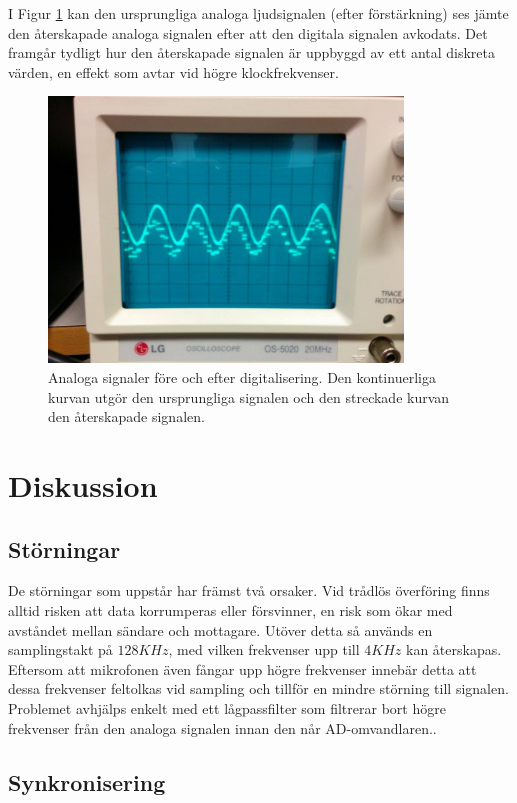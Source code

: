 \documentclass[a4paper,10pt]{article}
\begin{document}
I Figur \ref{oscilloskop} kan den ursprungliga analoga ljudsignalen (efter förstärkning) ses jämte den återskapade analoga signalen efter att den digitala
signalen avkodats. Det framgår tydligt hur den återskapade signalen är uppbyggd av ett antal diskreta värden, en effekt som avtar vid högre klockfrekvenser.

\begin{figure}[h]
\centering
\includegraphics[width=0.84\textwidth]{oscilloskop.jpg}
\caption{Analoga signaler före och efter digitalisering. Den kontinuerliga 
         kurvan utgör den ursprungliga signalen och den streckade kurvan den 
	 återskapade signalen.}
\label{oscilloskop}
\end{figure}


\section{Diskussion}
\subsection{Störningar}
De störningar som uppstår har främst två orsaker. Vid trådlös överföring finns 
alltid risken att data korrumperas eller försvinner, en risk som ökar med 
avståndet mellan sändare och mottagare. Utöver detta så används en samplingstakt 
på $128 KHz$, med vilken frekvenser upp till $4 KHz$ kan återskapas. Eftersom 
att mikrofonen även fångar upp högre frekvenser innebär detta att dessa 
frekvenser feltolkas vid sampling och tillför en mindre störning till signalen. 
Problemet avhjälps enkelt med ett lågpassfilter som filtrerar bort högre 
frekvenser från den analoga signalen innan den når AD-omvandlaren..

\subsection{Synkronisering}
\label{synkronisering}
\end{document}
